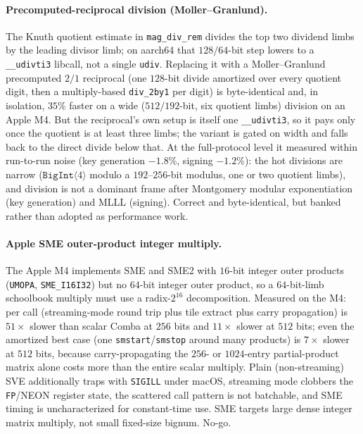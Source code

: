 \paragraph{Precomputed-reciprocal division (Moller--Granlund).}
The Knuth quotient estimate in \texttt{mag\_div\_rem} divides the top two
dividend limbs by the leading divisor limb; on aarch64 that $128/64$-bit
step lowers to a \texttt{\_\_udivti3} libcall, not a single \texttt{udiv}.
Replacing it with a Moller--Granlund precomputed $2/1$ reciprocal (one
$128$-bit divide amortized over every quotient digit, then a
multiply-based \texttt{div\_2by1} per digit) is byte-identical and, in
isolation, $35\%$ faster on a wide ($512/192$-bit, six quotient limbs)
division on an Apple M4.  But the reciprocal's own setup is itself one
\texttt{\_\_udivti3}, so it pays only once the quotient is at least three
limbs; the variant is gated on width and falls back to the direct divide
below that.  At the full-protocol level it measured within run-to-run
noise (key generation $-1.8\%$, signing $-1.2\%$): the hot divisions are
narrow ($\mathtt{BigInt}\langle 4\rangle$ modulo a $192$--$256$-bit
modulus, one or two quotient limbs), and division is not a dominant frame
after Montgomery modular exponentiation (key generation) and MLLL
(signing).  Correct and byte-identical, but banked rather than adopted as
performance work.

\paragraph{Apple SME outer-product integer multiply.}
The Apple M4 implements SME and SME2 with $16$-bit integer outer products
(\texttt{UMOPA}, \texttt{SME\_I16I32}) but no $64$-bit integer outer
product, so a $64$-bit-limb schoolbook multiply must use a radix-$2^{16}$
decomposition.  Measured on the M4: per call (streaming-mode round trip
plus tile extract plus carry propagation) is $51\times$ slower than scalar
Comba at $256$ bits and $11\times$ slower at $512$ bits; even the
amortized best case (one \texttt{smstart}/\texttt{smstop} around many
products) is $7\times$ slower at $512$ bits, because carry-propagating the
$256$- or $1024$-entry partial-product matrix alone costs more than the
entire scalar multiply.  Plain (non-streaming) SVE additionally traps with
\texttt{SIGILL} under macOS, streaming mode clobbers the \texttt{FP}/NEON
register state, the scattered call pattern is not batchable, and SME
timing is uncharacterized for constant-time use.  SME targets large dense
integer matrix multiply, not small fixed-size bignum.  No-go.

